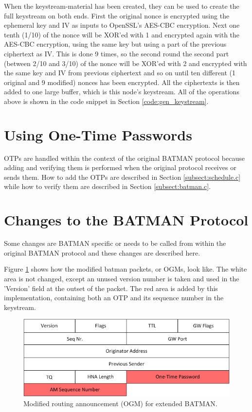 When the keystream-material has been created, they can be used to create the
full keystream on both ends. First the original nonce is encrypted using the
ephemeral key and IV as inputs to OpenSSL's AES-CBC encryption. Next one tenth
(1/10) of the nonce will be XOR'ed with 1 and encrypted again with the AES-CBC
encryption, using the same key but using a part of the previous ciphertext as
IV. This is done 9 times, so the second round the second part (between 2/10 and
3/10) of the nonce will be XOR'ed with 2 and encrypted with the same key and IV
from previous ciphertext and so on until ten different (1 original and 9
modified) nonces has been encrypted. All the ciphertexts is then added to one
large buffer, which is this node's keystream. All of the operations above is
shown in the code snippet in Section \ref{code:gen_keystream}.

\section{Using One-Time Passwords}
\acp{OTP} are handled within the context of the original BATMAN protocol because
adding and verifying them is performed when the original protocol receives or
sends them. How to add the OTPs are described in Section
\ref{subsect:schedule.c} while how to verify them are described in Section
\ref{subsect:batman.c}.

\section{Changes to the BATMAN Protocol}
Some changes are BATMAN specific or needs to be called from within the original
BATMAN protocol and these changes are described here.

Figure \ref{fig:extended_ogm} shows how the modified batman packets, or
\acp{OGM}, look like. The white area is not changed, except an unused version
number is taken and used in the 'Version' field at the outset of the packet. The
red area is added by this implementation, containing both an \ac{OTP} and its
sequence number in the keystream.

\begin{figure}[h]
	\centering
  	\includegraphics{images/extended_ogm.png}
  	\caption{Modified routing announcement (OGM) for extended BATMAN.}
	\label{fig:extended_ogm}
\end{figure}

